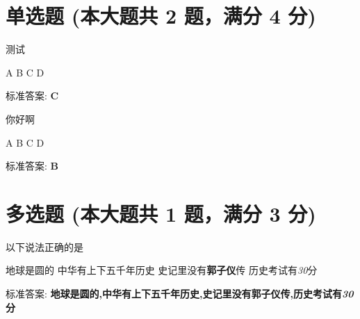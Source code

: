 \documentclass[12pt, a4paper, addpoints]{exam}
\begin{document}
\pagestyle{headandfoot}

\begin{center}
\end{center}
\vspace{5mm}

\normalsize
\vspace{5mm}

\section{\normalsize{单选题 (本大题共 2 题，满分 4 分)}}
\hspace{1.5cm}

\begin{questions}
\question[2] 测试

\begin{oneparchoices}
\choice A
\choice B
\choice C
\choice D
\end{oneparchoices}

标准答案: \textbf{C}

\question[2] 你好啊

\begin{oneparchoices}
\choice A
\choice B
\choice C
\choice D
\end{oneparchoices}

标准答案: \textbf{B}

\end{questions}

\hspace{5cm}

\section{\normalsize{多选题 (本大题共 1 题，满分 3 分)}}
\hspace{1.5cm}

\begin{questions}
\question[3] 以下说法正确的是

\begin{checkboxes}
\choice 地球是圆的
\choice 中华有上下五千年历史
\choice 史记里没有\textbf{郭子仪}传
\choice 历史考试有\textit{30}分
\end{checkboxes}

标准答案: \textbf{地球是圆的,中华有上下五千年历史,史记里没有\textbf{郭子仪}传,历史考试有\textit{30}分}

\end{questions}
\end{document}
